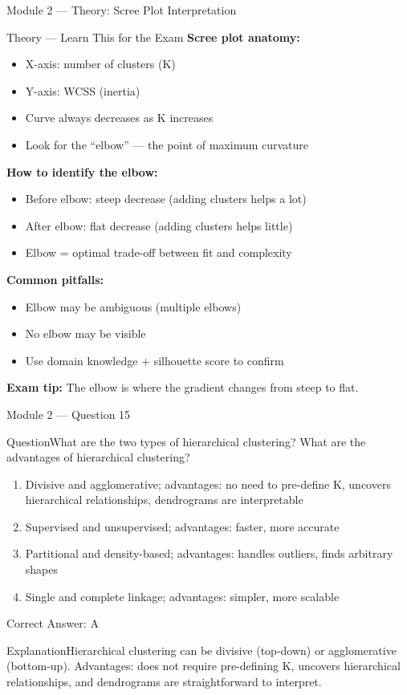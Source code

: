 \documentclass[aspectratio=169,10pt]{beamer}
\newcommand{\question}[1]{\begin{block}{Question}#1\end{block}}
\newcommand{\options}[4]{%
	\begin{enumerate}[label=\Alph*.,leftmargin=*]
		\item #1
		\item #2
		\item #3
		\item #4
	\end{enumerate}
}
\newcommand{\answerbox}[1]{\begin{exampleblock}{Correct Answer: #1}\end{exampleblock}}
\newcommand{\explain}[1]{\begin{block}{Explanation}#1\end{block}}
\newcommand{\theory}[1]{%
	\begin{block}{Theory --- Learn This for the Exam}
		\small #1
	\end{block}
}
\begin{document}
	\begin{frame}{Module 2 --- Theory: Scree Plot Interpretation}
		\theory{
			\textbf{Scree plot anatomy:}
			\begin{itemize}
				\item X-axis: number of clusters (K)
				\item Y-axis: WCSS (inertia)
				\item Curve always decreases as K increases
				\item Look for the ``elbow'' --- the point of maximum curvature
			\end{itemize}
			\textbf{How to identify the elbow:}
			\begin{itemize}
				\item Before elbow: steep decrease (adding clusters helps a lot)
				\item After elbow: flat decrease (adding clusters helps little)
				\item Elbow = optimal trade-off between fit and complexity
			\end{itemize}
			\textbf{Common pitfalls:}
			\begin{itemize}
				\item Elbow may be ambiguous (multiple elbows)
				\item No elbow may be visible
				\item Use domain knowledge + silhouette score to confirm
			\end{itemize}
			\textbf{Exam tip:} The elbow is where the gradient changes from steep to flat.
		}
	\end{frame}
	
	\begin{frame}{Module 2 --- Question 15}
		\question{What are the two types of hierarchical clustering? What are the advantages of hierarchical clustering?}
		\options{Divisive and agglomerative; advantages: no need to pre-define K, uncovers hierarchical relationships, dendrograms are interpretable}{Supervised and unsupervised; advantages: faster, more accurate}{Partitional and density-based; advantages: handles outliers, finds arbitrary shapes}{Single and complete linkage; advantages: simpler, more scalable}
		\answerbox{A}
		\explain{Hierarchical clustering can be divisive (top-down) or agglomerative (bottom-up). Advantages: does not require pre-defining K, uncovers hierarchical relationships, and dendrograms are straightforward to interpret.}
	\end{frame}
	
\end{document}
